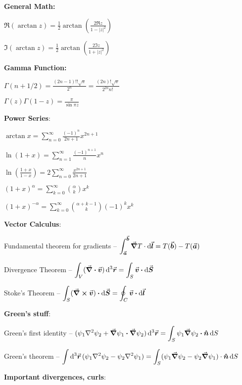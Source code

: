 \def\duedate{\today}
\def\HWnum{2}




\textbf{General Math:}

$\displaystyle \Re( \arctan{z} ) = \frac{1}{2} \arctan( \frac{2\Re{z}}{1 - |z|^2} )$

$\displaystyle \Im( \arctan{z} ) = \frac{1}{2} \arctan( \frac{2\Im{z}}{1 + |z|^2} )$

\textbf{Gamma Function:}

$\displaystyle \Gamma(n + 1/2) = \frac{(2n-1)!! \sqrt{\pi}}{2^{n}} = \frac{(2n)! \sqrt{\pi}}{2^{2n} n!}$

$\displaystyle \Gamma(z) \Gamma(1-z) = \frac{\pi}{\sin{\pi z}}$

\textbf{Power Series}:

$\displaystyle \arctan{x} = \sum_{n=0}^{\infty} \frac{(-1)^{n}}{2n+1} x^{2n+1}$

$\displaystyle \ln(1 + x) = \sum_{n=1}^{\infty} \frac{(-1)^{n+1}}{n} x^{n}$

$\displaystyle \ln(\frac{1+x}{1-x}) = 2\sum_{n=0}^{\infty} \frac{x^{2n+1}}{2n+1}$

$\displaystyle (1+x)^{\alpha} = \sum_{k=0}^{\infty} \binom{\alpha}{k} x^{k}$

$\displaystyle (1+x)^{-\alpha} = \sum_{k=0}^{\infty} \binom{\alpha + k - 1}{k} (-1)^{k} x^{k}$

\textbf{Vector Calculus}:

Fundamental theorem for gradients -- $\displaystyle \int_{\va*{a}}^{\va*{b}} \grad{T} \cdot \dd{\va*{l}} = T(\va*{b}) - T(\va*{a})$

Divergence Theorem -- $\displaystyle \int_{V} (\div{\va*{v}}) \dd[3]{\va*{r}} = \int_{S} \va*{v} \vdot \dd{\va*{S}}$

Stoke's Theorem -- $\displaystyle \int_{S} ( \curl{\va*{v}} ) \vdot \dd{\va*{S}} = \oint_{C} \va*{v} \vdot \dd{\va*{l}}$

\textbf{Green's stuff}:

Green's first identity -- $\displaystyle ( \psi_1 \laplacian \psi_2 + \grad \psi_1 \vdot \grad \psi_2 ) \dd[3]{\va*{r}} = \int_{S} \psi_1 \grad \psi_2 \vdot \vu*{n} \dd{S}$

Green's theorem -- $\displaystyle \int \dd[3]{\va*{r}} ( \psi_1 \laplacian \psi_2 - \psi_2 \laplacian \psi_1 ) = \int_{S} ( \psi_1 \grad \psi_2 - \psi_2 \grad \psi_1 ) \cdot \vu*{n} \dd{S}$

\textbf{Important divergences, curls}:

